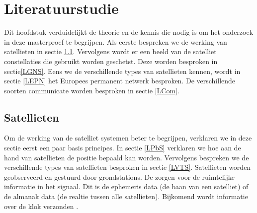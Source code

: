 \chapter{Literatuurstudie}
Dit hoofdstuk verduidelijkt de theorie en de kennis die nodig is om het onderzoek in deze masterproef te begrijpen. Als eerste bespreken we de werking van satellieten in sectie \ref{LSat}. Vervolgens wordt er een beeld van de satelliet constellaties die gebruikt worden geschetst. Deze worden besproken in sectie\ref{LGNS}. Eens we de verschillende types van satellieten kennen, wordt in sectie \ref{LEPN} het Europees permanent netwerk besproken. De verschillende soorten communicate worden besproken in sectie \ref{LCom}.

\section{Satellieten}
\label{LSat}
Om de werking van de satelliet systemen beter te begrijpen, verklaren we in deze sectie eerst een paar basis principes. In sectie \ref{LPbS} verklaren we hoe aan de hand van satellieten de positie bepaald kan worden. Vervolgens bespreken we de verschillende types van satellieten  besproken in sectie \ref{LVTS}. Satellieten worden geobserveerd en gestuurd door grondstations. De zorgen voor de ruimtelijke informatie in het signaal. Dit is de ephemeris data (de baan van een satelliet) of de almanak data (de realtie tussen alle satellieten). Bijkomend wordt informatie over de klok verzonden \cite{LBibGNSS8}.

